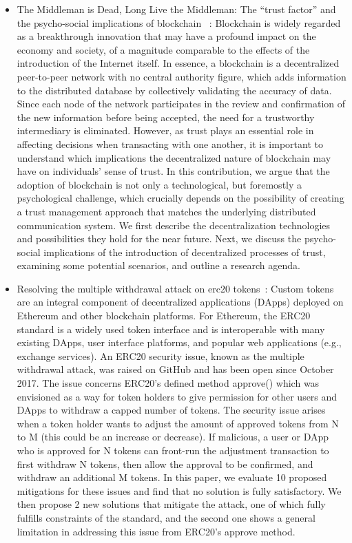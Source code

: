 \begin{itemize}

    \item{The Middleman is Dead, Long Live the Middleman: The “trust factor” and the psycho-social implications of blockchain ~\cite{gaggioli2019middleman}}: Blockchain is widely regarded as a breakthrough innovation that may have a profound impact on the economy and society, of a magnitude comparable to the effects of the introduction of the Internet itself. In essence, a blockchain is a decentralized peer-to-peer network with no central authority figure, which adds information to the distributed database by collectively validating the accuracy of data. Since each node of the network participates in the review and confirmation of the new information before being accepted, the need for a trustworthy intermediary is eliminated. However, as trust plays an essential role in affecting decisions when transacting with one another, it is important to understand which implications the decentralized nature of blockchain may have on individuals' sense of trust. In this contribution, we argue that the adoption of blockchain is not only a technological, but foremostly a psychological challenge, which crucially depends on the possibility of creating a trust management approach that matches the underlying distributed communication system. We first describe the decentralization technologies and possibilities they hold for the near future. Next, we discuss the psycho-social implications of the introduction of decentralized processes of trust, examining some potential scenarios, and outline a research agenda.

    \item{Resolving the multiple withdrawal attack on erc20 tokens~\cite{rahimian2019resolving}:} Custom tokens are an integral component of decentralized applications (DApps) deployed on Ethereum and other blockchain platforms. For Ethereum, the ERC20 standard is a widely used token interface and is interoperable with many existing DApps, user interface platforms, and popular web applications (e.g., exchange services). An ERC20 security issue, known as the multiple withdrawal attack, was raised on GitHub and has been open since October 2017. The issue concerns ERC20's defined method approve() which was envisioned as a way for token holders to give permission for other users and DApps to withdraw a capped number of tokens. The security issue arises when a token holder wants to adjust the amount of approved tokens from N to M (this could be an increase or decrease). If malicious, a user or DApp who is approved for N tokens can front-run the adjustment transaction to first withdraw N tokens, then allow the approval to be confirmed, and withdraw an additional M tokens. In this paper, we evaluate 10 proposed mitigations for these issues and find that no solution is fully satisfactory. We then propose 2 new solutions that mitigate the attack, one of which fully fulfills constraints of the standard, and the second one shows a general limitation in addressing this issue from ERC20’s approve method.

\end{itemize}

